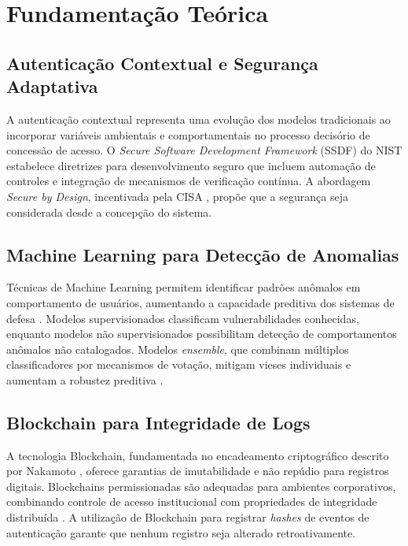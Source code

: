 \documentclass[12pt]{article}
\begin{document}
\section{Fundamentação Teórica}

\subsection{Autenticação Contextual e Segurança Adaptativa}

A autenticação contextual representa uma evolução dos modelos tradicionais ao incorporar variáveis ambientais e comportamentais no processo decisório de concessão de acesso. O \textit{Secure Software Development Framework} (SSDF) do NIST \cite{nist2022} estabelece diretrizes para desenvolvimento seguro que incluem automação de controles e integração de mecanismos de verificação contínua. A abordagem \textit{Secure by Design}, incentivada pela CISA \cite{cisa2023}, propõe que a segurança seja considerada desde a concepção do sistema.

\subsection{Machine Learning para Detecção de Anomalias}

Técnicas de Machine Learning permitem identificar padrões anômalos em comportamento de usuários, aumentando a capacidade preditiva dos sistemas de defesa \cite{nist2023ai}. Modelos supervisionados classificam vulnerabilidades conhecidas, enquanto modelos não supervisionados possibilitam detecção de comportamentos anômalos não catalogados. Modelos \textit{ensemble}, que combinam múltiplos classificadores por mecanismos de votação, mitigam vieses individuais e aumentam a robustez preditiva \cite{scikit2024}.

\subsection{Blockchain para Integridade de Logs}

A tecnologia Blockchain, fundamentada no encadeamento criptográfico descrito por Nakamoto \cite{nakamoto2008}, oferece garantias de imutabilidade e não repúdio para registros digitais. Blockchains permissionadas são adequadas para ambientes corporativos, combinando controle de acesso institucional com propriedades de integridade distribuída \cite{nist2018blockchain}. A utilização de Blockchain para registrar \textit{hashes} de eventos de autenticação garante que nenhum registro seja alterado retroativamente.
\end{document}
